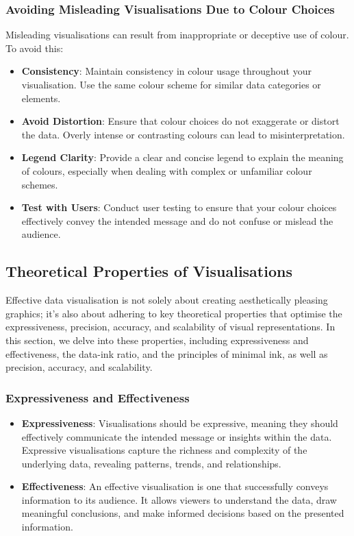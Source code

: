 \documentclass{article}\usepackage[]{graphicx}\usepackage[]{xcolor}
\begin{document}
\subsubsection{Avoiding Misleading Visualisations Due to Colour Choices}
Misleading visualisations can result from inappropriate or deceptive use of colour. To avoid this:
\begin{itemize}
    \item \textbf{Consistency}: Maintain consistency in colour usage throughout your visualisation. Use the same colour scheme for similar data categories or elements.
    \item \textbf{Avoid Distortion}: Ensure that colour choices do not exaggerate or distort the data. Overly intense or contrasting colours can lead to misinterpretation.
    \item \textbf{Legend Clarity}:  Provide a clear and concise legend to explain the meaning of colours, especially when dealing with complex or unfamiliar colour schemes. 
    \item \textbf{Test with Users}: Conduct user testing to ensure that your colour choices effectively convey the intended message and do not confuse or mislead the audience.
\end{itemize}

\subsection{Theoretical Properties of Visualisations}
Effective data visualisation is not solely about creating aesthetically pleasing graphics; it's also about adhering to key theoretical properties that optimise the expressiveness, precision, accuracy, and scalability of visual representations. In this section, we delve into these properties, including expressiveness and effectiveness, the data-ink ratio, and the principles of minimal ink, as well as precision, accuracy, and scalability.

\subsubsection{Expressiveness and Effectiveness}
\begin{itemize}
    \item \textbf{Expressiveness}: Visualisations should be expressive, meaning they should effectively communicate the intended message or insights within the data. Expressive visualisations capture the richness and complexity of the underlying data, revealing patterns, trends, and relationships.
    \item \textbf{Effectiveness}: An effective visualisation is one that successfully conveys information to its audience. It allows viewers to understand the data, draw meaningful conclusions, and make informed decisions based on the presented information.
\end{itemize}
\end{document}
